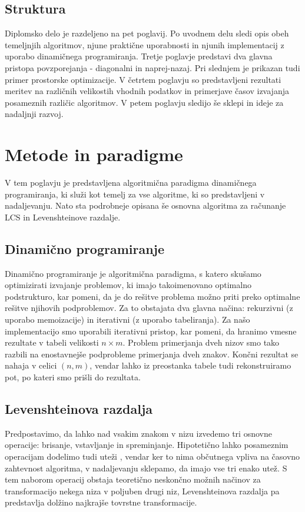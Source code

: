 \documentclass[a4paper,12pt,openright]{book}
\begin{document}
\section{Struktura}

Diplomsko delo je razdeljeno na pet poglavij. Po uvodnem delu sledi opis obeh temeljnjih algoritmov, njune praktične uporabnosti in njunih implementacij z uporabo dinamičnega programiranja. Tretje poglavje predstavi dva glavna pristopa povzporejanja - diagonalni in naprej-nazaj. Pri slednjem je prikazan tudi primer prostorske optimizacije. V četrtem poglavju so predstavljeni rezultati meritev na različnih velikostih vhodnih podatkov in primerjave časov izvajanja posameznih različic algoritmov. V petem poglavju sledijo še sklepi in ideje za nadaljnji razvoj. 

\chapter{Metode in paradigme}

V tem poglavju je predstavljena algoritmična paradigma dinamičnega programiranja, ki služi kot temelj za vse algoritme, ki so predstavljeni v nadaljevanju. Nato sta podrobneje opisana še osnovna algoritma za računanje LCS in Levenshteinove razdalje. 

\section{Dinamično programiranje}

Dinamično programiranje je algoritmična paradigma, s katero skušamo optimizirati izvajanje problemov, ki imajo takoimenovano optimalno podstrukturo, kar pomeni, da je do rešitve problema možno priti preko optimalne rešitve njihovih podproblemov. Za to obstajata dva glavna načina: rekurzivni (z uporabo memoizacije) in iterativni (z uporabo tabeliranja). Za našo implementacijo smo uporabili iterativni pristop, kar pomeni, da hranimo vmesne rezultate v tabeli velikosti $n \times m$. Problem primerjanja dveh nizov smo tako razbili na enostavnejše podprobleme primerjanja dveh znakov. Končni rezultat se nahaja v celici $(n,m)$, vendar lahko iz preostanka tabele tudi rekonstruiramo pot, po kateri smo prišli do rezultata. 

\section{Levenshteinova razdalja}

Predpostavimo, da lahko nad vsakim znakom v nizu izvedemo tri osnovne operacije: brisanje, vstavljanje in spreminjanje. Hipotetično lahko posameznim operacijam dodelimo tudi uteži \cite{weightedLevenshtein}, vendar ker to nima občutnega vpliva na časovno zahtevnost algoritma, v nadaljevanju sklepamo, da imajo vse tri enako utež. S tem naborom operacij obstaja teoretično neskončno možnih načinov za transformacijo nekega niza v poljuben drugi niz, Levenshteinova razdalja pa predstavlja dolžino najkrajše tovrstne transformacije. 
\end{document}
